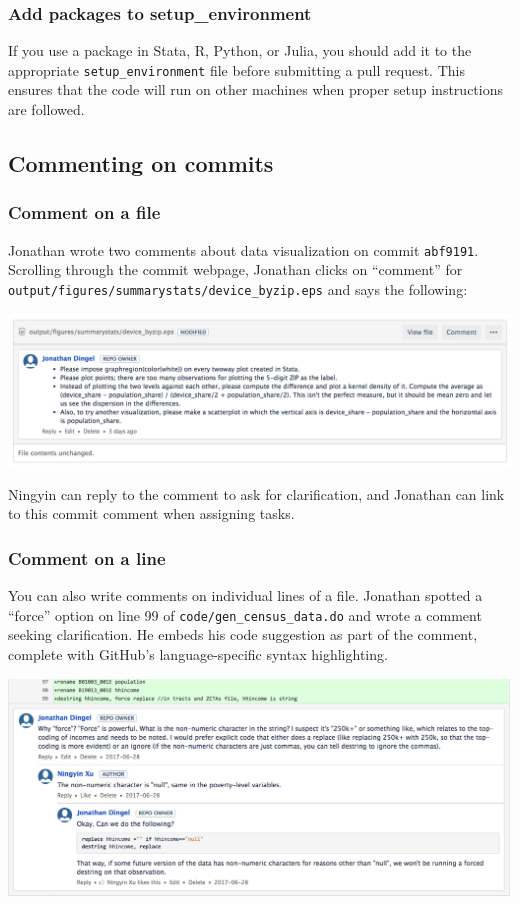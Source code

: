 \subsubsection{Add packages to setup\_environment}
If you use a package in Stata, R, Python, or Julia,
you should add it to the appropriate \texttt{setup\_environment} file before
submitting a pull request.
This ensures that the code will run on other machines when proper setup
instructions are followed.

\subsection{Commenting on commits}

\subsubsection{Comment on a file}
Jonathan wrote two comments about data visualization on commit \texttt{abf9191}.
Scrolling through the commit webpage, Jonathan clicks on ``comment'' for \texttt{output/figures/summarystats/device\_byzip.eps} and says the following:
\begin{center}\includegraphics[width=.8\textwidth]{./figures/workflow/BitBucket_screenshot_commenting1.png}\end{center}
Ningyin can reply to the comment to ask for clarification, and Jonathan can link to this commit comment when assigning tasks.

\subsubsection{Comment on a line}
You can also write comments on individual lines of a file.
Jonathan spotted a ``force'' option on line 99 of \texttt{code/gen\_census\_data.do} and wrote a comment seeking clarification.
He embeds his code suggestion as part of the comment, complete with GitHub's language-specific syntax highlighting.
\begin{center}\includegraphics[width=\textwidth]{./figures/workflow/BitBucket_screenshot_commenting2.png}\end{center}

